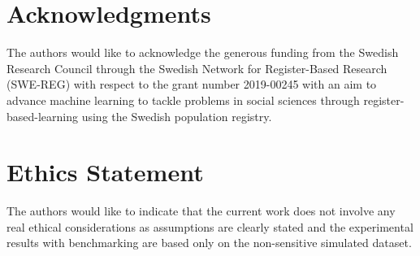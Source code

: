 \documentclass[letterpaper]{article} %
\begin{document}


\section*{Acknowledgments}
The authors would like to acknowledge the generous funding from the Swedish Research Council through the Swedish Network for Register-Based Research (SWE-REG) with respect to the grant number 2019-00245 with an aim to advance machine learning to tackle problems in social sciences through register-based-learning using the Swedish population registry.


\section*{Ethics Statement}
The authors would like to indicate that the current work does not involve any real ethical considerations as assumptions are clearly stated and the experimental results with benchmarking are based only on the non-sensitive simulated dataset.


% 



\end{document}
